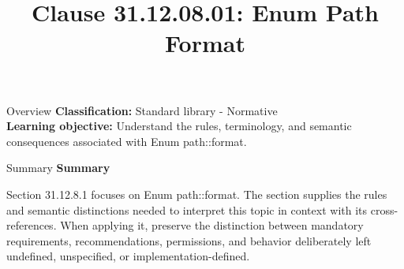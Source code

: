 \documentclass[10pt,letterpaper]{article}
\title{Clause 31.12.08.01: Enum Path Format}
\author{}
\date{}
\begin{document}
\maketitle
\begin{CornellOverviewBox}{Overview}
\textbf{Classification:} Standard library - Normative\\[2pt]
\textbf{Learning objective:} Understand the rules, terminology, and semantic consequences associated with Enum path::format.
\end{CornellOverviewBox}\begin{CornellSummaryBox}{Summary}
{\sffamily\bfseries\color{Accent} Summary}\par\vspace{3pt}Section 31.12.8.1 focuses on Enum path::format. The section supplies the rules and semantic distinctions needed to interpret this topic in context with its cross-references. When applying it, preserve the distinction between mandatory requirements, recommendations, permissions, and behavior deliberately left undefined, unspecified, or implementation-defined.
\end{CornellSummaryBox}
\end{document}

